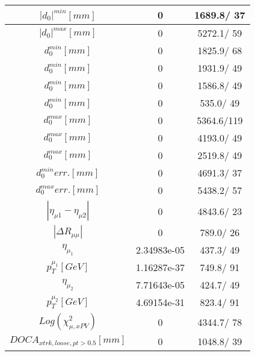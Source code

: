 \documentclass{article}
\begin{document}
\begin{table}[htbp]
\begin{center}
\begin{tabular}{c|c|c}
\hline
$|d_{0}|^{min} [mm]$ & 0 & 1689.8/ 37\\
\hline
$|d_{0}|^{max} [mm]$ & 0 & 5272.1/ 59\\
\hline
$d_{0}^{min} [mm]$ & 0 & 1825.9/ 68\\
\hline
$d_{0}^{min} [mm]$ & 0 & 1931.9/ 49\\
\hline
$d_{0}^{min} [mm]$ & 0 & 1586.8/ 49\\
\hline
$d_{0}^{min} [mm]$ & 0 & 535.0/ 49\\
\hline
$d_{0}^{max} [mm]$ & 0 & 5364.6/119\\
\hline
$d_{0}^{max} [mm]$ & 0 & 4193.0/ 49\\
\hline
$d_{0}^{max} [mm]$ & 0 & 2519.8/ 49\\
\hline
$d_{0}^{min} err. [mm]$ & 0 & 4691.3/ 37\\
\hline
$d_{0}^{max} err. [mm]$ & 0 & 5438.2/ 57\\
\hline
$|\eta_{\mu1}-\eta_{\mu2}|$ & 0 & 4843.6/ 23\\
\hline
$|\Delta R_{\mu \mu}|$ & 0 & 789.0/ 26\\
\hline
$\eta_{\mu_{1}}$ & 2.34983e-05 & 437.3/ 49\\
\hline
$p_{T}^{\mu_{1}} [GeV]$ & 1.16287e-37 & 749.8/ 91\\
\hline
$\eta_{\mu_{2}}$ & 7.71643e-05 & 424.7/ 49\\
\hline
$p_{T}^{\mu_{2}} [GeV]$ & 4.69154e-31 & 823.4/ 91\\
\hline
$Log(\chi^{2}_{\mu,xPV})$ & 0 & 4344.7/ 78\\
\hline
$DOCA_{xtrk, loose, pt>0.5} [mm]$ & 0 & 1048.8/ 39\\
\hline
\end{tabular}
\end{center}
\end{table}
\end{document}
